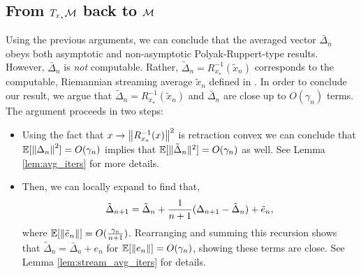 \subsection{From $T_{x_\star} \mathcal{M}$ back to $\mathcal{M}$} \label{sec:pfsketch3}
\vspace{-.0856cm}
Using the previous arguments, we can conclude that the averaged vector $\bar{\Delta}_n$ obeys both asymptotic and non-asymptotic Polyak-Ruppert-type results. However, $\bar{\Delta}_n$
is \textit{not} computable. Rather, $\tilde{\Delta}_n = R_{x_\star}^{-1}(\tilde{x}_n)$ corresponds to the computable, Riemannian streaming average $\tilde{x}_n$ defined in . In order to conclude our result, we argue that $\tilde{\Delta}_n = R_{x_\star}^{-1}(\tilde{x}_n)$ and $\bar{\Delta}_n$ are close up to $O(\gamma_n)$ terms. The argument proceeds in two steps:
\begin{itemize}
\vspace*{-6pt}
  \item Using the fact that $x \to \norm{R_{x_\star}^{-1}(x)}^2$ is retraction convex we can conclude that $\mathbb{E}[\norm{\Delta_n}^2] = O(\gamma_n)$ implies that  $\mathbb{E}[\Vert \tilde{\Delta}_n\Vert^2] = O(\gamma_n)$ as well. See Lemma \ref{lem:avg_iters} for more details.
  \vspace*{-6pt}
  \item Then, we can locally expand  to find that,
  \vspace*{-6pt}
  \[
    \tilde{\Delta}_{n+1} = \tilde{\Delta}_n + \frac{1}{n+1}(\Delta_{n+1}-\tilde{\Delta}_n)+\tilde{e}_n,
 \vspace*{-6pt} \]
  where $\mathbb{E}[\Vert \tilde{e}_n\Vert] = O(\frac{\gamma_n}{n+1})$. Rearranging and summing this recursion shows that $\tilde{\Delta}_n = \bar{\Delta}_n+e_n$ for $\mathbb{E}[\Vert e_n\Vert] = O(\gamma_n)$, showing these terms are close. See Lemma \ref{lem:stream_avg_iters} for details.
  \vspace*{-6pt}
\end{itemize}
